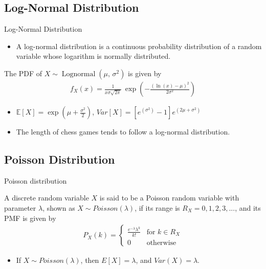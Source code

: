 \documentclass[10pt]{beamer}
\begin{document}
\subsection{Log-Normal Distribution}
\begin{frame}{Log-Normal Distribution}
    \begin{itemize}
        \item A log-normal distribution is a continuous probability distribution of a random variable whose logarithm is normally distributed. 
    \end{itemize}
    \begin{block}{}
    The PDF of $X \sim {\displaystyle \operatorname {Lognormal} (\mu ,\,\sigma ^{2})}$ is given by 
    \begin{align}
        {f_X(x) =  {\frac {1}{x\sigma {\sqrt {2\pi }}}}\ \exp \left(-{\frac {\left(\ln \left(x\right)-\mu \right)^{2}}{2\sigma ^{2}}}\right)}
    \end{align}
    \end{block}
    \begin{itemize}
        \item ${\mathbb{E}[X]} = {\displaystyle \exp \left(\mu +{\frac {\sigma ^{2}}{2}}\right)}$, \hspace{4mm} $Var[X] = {\displaystyle [e^{(\sigma ^{2})}-1]e^{(2\mu +\sigma ^{2})}}$
        \item The length of chess games tends to follow a log-normal distribution.
    \end{itemize}
\end{frame}
\subsection{Poisson Distribution}
\begin{frame}{Poisson distribution}
    \begin{block}{}
    A discrete random variable $X$ is said to be a Poisson random variable with parameter $\lambda$, shown as $X \sim Poisson(\lambda)$, if its range is $R_X={0,1,2,3,...}$, and its PMF is given by
    \begin{align}
        P_X(k)=\begin{cases}
        \frac{e^{-\lambda}\lambda^{k}}{k!} & \text{for } k \in R_X \\
        0 & \text{otherwise}
        \end{cases}
    \end{align}
    \end{block}
    \begin{itemize}
        \item If $X\sim Poisson(\lambda)$, then $E[X]=\lambda$, and $Var(X)=\lambda$.
    \end{itemize}
\end{frame}
\end{document}
